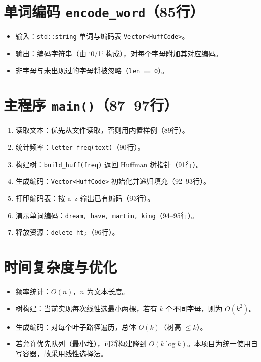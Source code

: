 \documentclass[12pt]{article}
\begin{document}
\section{单词编码 \texttt{encode\_word}（85行）}
\begin{itemize}[leftmargin=1.4em]
  \item 输入：\texttt{std::string} 单词与编码表 \texttt{Vector<HuffCode>}。
  \item 输出：编码字符串（由 `0/1` 构成），对每个字母附加其对应编码。
  \item 非字母与未出现过的字母将被忽略（\texttt{len == 0}）。
\end{itemize}

\section{主程序 \texttt{main()}（87--97行）}
\begin{enumerate}[leftmargin=1.4em]
  \item 读取文本：优先从文件读取，否则用内置样例（89行）。
  \item 统计频率：\texttt{letter\_freq(text)}（90行）。
  \item 构建树：\texttt{build\_huff(freq)} 返回 Huffman 树指针（91行）。
  \item 生成编码：\texttt{Vector<HuffCode>} 初始化并递归填充（92--93行）。
  \item 打印编码表：按 a--z 输出已有编码（93行）。
  \item 演示单词编码：\texttt{dream, have, martin, king}（94--95行）。
  \item 释放资源：\texttt{delete ht;}（96行）。
\end{enumerate}

\section{时间复杂度与优化}
\begin{itemize}[leftmargin=1.4em]
  \item 频率统计：\(O(n)\)，\(n\) 为文本长度。
  \item 树构建：当前实现每次线性选最小两棵，若有 \(k\) 个不同字母，则为 \(O(k^2)\)。
  \item 生成编码：对每个叶子路径遍历，总体 \(O(k)\)（树高 \(\le k\)）。
  \item 若允许优先队列（最小堆），可将构建降到 \(O(k \log k)\)。本项目为统一使用自写容器，故采用线性选择法。
\end{itemize}
\end{document}
